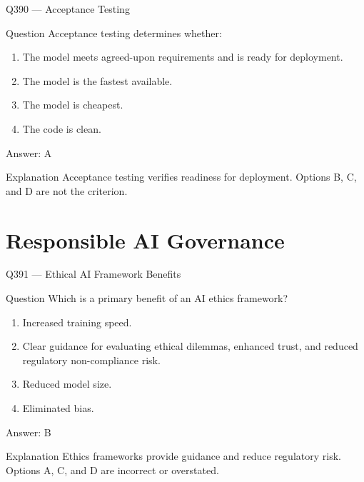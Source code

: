 \documentclass[aspectratio=169,8pt]{beamer}
\begin{document}
	\begin{frame}{Q390 --- Acceptance Testing}
		\begin{block}{Question}
			Acceptance testing determines whether:
			\begin{enumerate}
				\item The model meets agreed-upon requirements and is ready for deployment.
				\item The model is the fastest available.
				\item The model is cheapest.
				\item The code is clean.
			\end{enumerate}
		\end{block}
		\begin{exampleblock}{Answer: A}\end{exampleblock}
		\begin{block}{Explanation}
			Acceptance testing verifies readiness for deployment. Options B, C, and D are not the criterion.
		\end{block}
	\end{frame}
	
	\section{Responsible AI Governance}
	
	\begin{frame}{Q391 --- Ethical AI Framework Benefits}
		\begin{block}{Question}
			Which is a primary benefit of an AI ethics framework?
			\begin{enumerate}
				\item Increased training speed.
				\item Clear guidance for evaluating ethical dilemmas, enhanced trust, and reduced regulatory non-compliance risk.
				\item Reduced model size.
				\item Eliminated bias.
			\end{enumerate}
		\end{block}
		\begin{exampleblock}{Answer: B}\end{exampleblock}
		\begin{block}{Explanation}
			Ethics frameworks provide guidance and reduce regulatory risk. Options A, C, and D are incorrect or overstated.
		\end{block}
	\end{frame}
	
\end{document}
